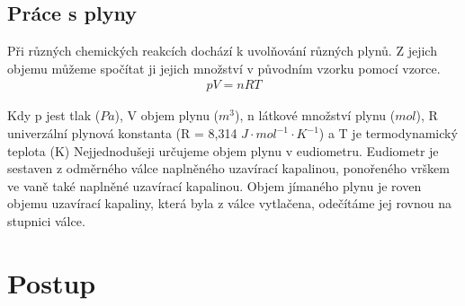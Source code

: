 \documentclass[13pt, a4paper, twoside]{article}
\begin{document}
\subsection*{Práce s plyny}
Při různých chemických reakcích dochází k uvolňování různých plynů. Z jejich objemu můžeme spočítat ji jejich množství v původním vzorku pomocí vzorce.
\begin{align*}
    pV=nRT
\end{align*}

Kdy p jest tlak ($Pa$), V objem plynu ($m^3$), n látkové množství plynu ($mol$), R univerzální plynová konstanta  (R = 8,314 $J\cdot mol^{-1}\cdot K^{-1}$) a T je termodynamický teplota (K)
Nejjednodušeji určujeme objem plynu v eudiometru. Eudiometr je sestaven z odměrného válce naplněného uzavírací kapalinou, ponořeného vrškem ve vaně také naplněné uzavírací kapalinou. Objem jímaného plynu je roven objemu uzavírací kapaliny, která byla z válce vytlačena, odečítáme jej rovnou na stupnici válce.

\section*{Postup}
\end{document}
